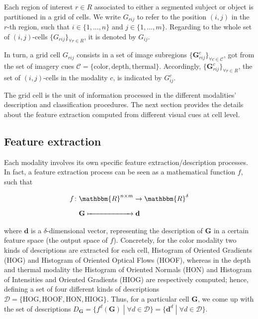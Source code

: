 \documentclass[10pt,twocolumn,letterpaper]{article}
\begin{document}
Each region of interest $r \in R$ associated to either a segmented subject or object is partitioned in a grid of cells. We write $G_{rij}$ to refer to the position $(i,j)$ in the $r$-th region, such that $i \in \{ 1,...,n \}$ and $j \in \{ 1,...,m \}$. Regarding to the whole set of $(i,j)$-cells $\{G_{rij}\}_{\forall r \in R}$, it is denoted by $G_{ij}$.

In turn, a grid cell $G_{rij}$ consists in a set of image subregions $\{\mathbf{G}_{rij}^c\}_{\forall{c} \in \mathcal{C}}$, got from the set of imagery cues $\mathcal{C} = \{\mathrm{color}, \mathrm{depth}, \mathrm{thermal}\}$. Accordingly, $\{\mathbf{G}_{rij}^c\}_{\forall r \in R}$, the set of $(i,j)$-cells in the modality $c$, is indicated by $G_{ij}^c$.

The grid cell is the unit of information processed in the different modalities' description and classification procedures. The next section provides the details about the feature extraction computed from different visual cues at cell level.

\subsection{Feature extraction}
\label{ssec:feature extraction}

Each modality involves its own specific feature extraction/description processes. In fact, a feature extraction process can be seen as a mathematical function $f$, such that

\begin{align}
\begin{split}
f \colon & \mathbbm{R}^{n \times m} \to \mathbbm{R}^\delta \\
& \mathbf{G} \xmapsto{\phantom{\mathbbm{R}^{n \times m}}} \mathbf{d}
\end{split}
\end{align}

where $\mathbf{d}$ is a $\delta$-dimensional vector, representing the description of $\mathbf{G}$ in a certain feature space (the output space of $f$). Concretely, for the color modality two kinds of descriptions are extracted for each cell, Histogram of Oriented Gradients (HOG) and Histogram of Oriented Optical Flows (HOOF), whereas in the depth and thermal modality the Histogram of Oriented Normals (HON) and Histogram of Intensities and Oriented Gradients (HIOG) are respectively computed; hence, defining a set of four different kinds of descriptions $\mathcal{D} = \{\mathrm{HOG}, \mathrm{HOOF}, \mathrm{HON}, \mathrm{HIOG}\}$. Thus, for a particular cell $\mathbf{G}$, we come up with the set of descriptions $D_{\mathbf{G}} = \{f^d(\mathbf{G}) \;|\; \forall d \in \mathcal{D}\} = \{\mathbf{d}^d \;|\; \forall d \in \mathcal{D}\}$.
\end{document}
